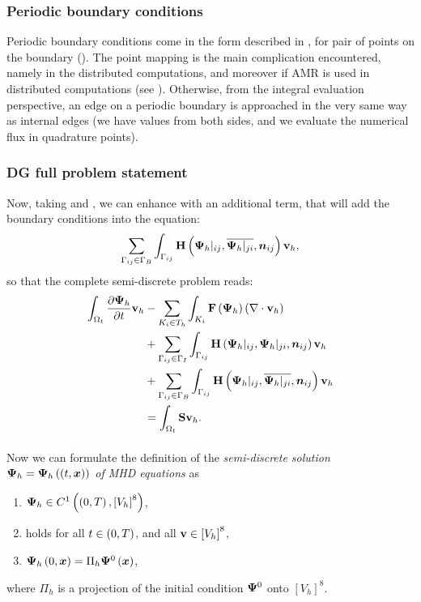 \subsubsection{Periodic boundary conditions}
\label{sec:periodicDg}
Periodic boundary conditions come in the form described in , for pair of points on the boundary (). The point mapping is the main complication encountered, namely in the distributed computations, and moreover if AMR is used in distributed computations (see ). Otherwise, from the integral evaluation perspective, an edge on a periodic boundary is approached in the very same way as internal edges (we have values from both sides, and we evaluate the numerical flux in quadrature points).

\subsubsection{DG full problem statement}
Now, taking  and , we can enhance  with an additional term, that will add the boundary conditions into the equation:
$$
\sum_{\Gamma_{ij}\in\Gamma_B} \int_{\Gamma_{ij}} \mathrm{\mathbf{H}}\left({\mathrm{\mathbf{\Psi}}_h}|_{ij}, \overline{{\mathrm{\mathbf{\Psi}}_h}|_{ji}}, \mbox{\boldmath $n$}_{ij}\right) \mathrm{\mathbf{v}}_h,
$$
so that the complete semi-discrete problem reads:
\begin{align}
\label{DG3} \int_{\Omega_{t}} \frac{\partial{{\mathrm{\mathbf{\Psi}}_h}}}{\partial{t}} \mathrm{\mathbf{v}}_h & -  \sum_{K_i \in T_h}\int_{K_i}\mathrm{\mathbf{F}}\left({\mathrm{\mathbf{\Psi}}_h}\right) \left(\nabla \cdot \mathrm{\mathbf{v}}_h\right)\\ \nonumber & + \sum_{\Gamma_{ij}\in\Gamma_I} \int_{\Gamma_{ij}} \mathrm{\mathbf{H}}\left({\mathrm{\mathbf{\Psi}}_h}|_{ij}, {\mathrm{\mathbf{\Psi}}_h}|_{ji}, \mbox{\boldmath $n$}_{ij}\right) \mathrm{\mathbf{v}}_h\\
\nonumber & + \sum_{\Gamma_{ij}\in\Gamma_B} \int_{\Gamma_{ij}} \mathrm{\mathbf{H}}\left({\mathrm{\mathbf{\Psi}}_h}|_{ij}, \overline{{\mathrm{\mathbf{\Psi}}_h}|_{ji}}, \mbox{\boldmath $n$}_{ij}\right) \mathrm{\mathbf{v}}_h\\
\nonumber & = \int_{\Omega_{t}} \mathrm{\mathbf{S}} \mathrm{\mathbf{v}}_h.
\end{align}

\paragraph{}
Now we can formulate the definition of the \textit{semi-discrete solution ${\mathrm{\mathbf{\Psi}}_h} = {\mathrm{\mathbf{\Psi}}_h}\left((t, \mbox{\boldmath $x$}\right))$ of MHD equations } as
\begin{enumerate}
    \label{discreteSlnDef}
    \item ${\mathrm{\mathbf{\Psi}}_h} \in C^{1}\left(\left(0, T\right), \left[V_h\right]^8\right)$,
    \item {} holds for all $t\in\left(0, T\right)$, and all $\mathrm{\mathbf{v}}\in \left[V_h\right]^8$,
    \item ${\mathrm{\mathbf{\Psi}}_h}\left(0, \mbox{\boldmath $x$}\right) = \Pi_h \mathrm{\mathbf{\Psi}}^0\left(\mbox{\boldmath $x$}\right)$,
\end{enumerate}
where $\Pi_h$ is a projection of the initial condition $\mathrm{\mathbf{\Psi}}^0$ onto $\left[V_h\right]^8$.


